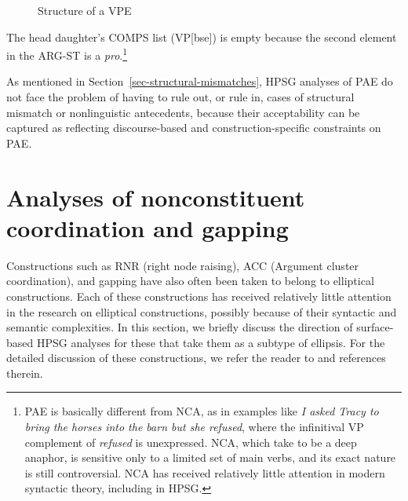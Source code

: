 {\begin{figure}
\caption{Structure of a VPE}\label{fig-53}
\end{figure}
%
The head daughter's COMPS list (VP[bse]) is empty because the second element in the ARG-ST
is a \textit{pro}.\footnote{PAE is basically different from NCA, as in examples like \textit{I asked Tracy to bring the horses into the barn but she refused}, where the infinitival VP complement of
\textit{refused} is unexpressed. NCA, which \citet{Hankamer1976} take to be a deep anaphor, is sensitive only to a limited set of main verbs, and its exact nature is still controversial. NCA has received relatively little attention in modern syntactic theory, including in HPSG.}

As mentioned in Section~\ref{sec-structural-mismatches}, HPSG analyses of PAE do not face the problem of having to rule out, or rule in, cases of structural mismatch or nonlinguistic antecedents, because their acceptability can be captured as reflecting discourse-based and construction-specific constraints on PAE.



\section{Analyses of nonconstituent coordination and gapping}
\label{sec-analyses-of-noncon}

Constructions such as
RNR (right node raising), ACC (Argument cluster coordination), and gapping have also often been taken to belong
to elliptical constructions. Each of these constructions has received
relatively little attention in the research on elliptical constructions, possibly
because of their syntactic and semantic complexities. In this
section, we briefly discuss the direction of surface-based HPSG analyses
for these that take them as a subtype of ellipsis. For the 
detailed discussion of these constructions, we refer the
reader to  and references 
therein. 
%
%

}
